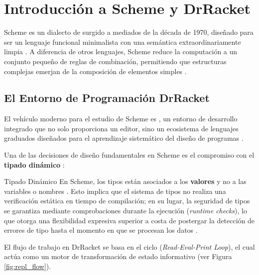 \section{Introducción a Scheme y DrRacket}
\label{sec:4_2_intro_scheme}

Scheme es un dialecto de  surgido a mediados de la década de 1970, diseñado para ser un lenguaje funcional minimalista con una semántica extraordinariamente limpia \cite{SICP}. A diferencia de otros lenguajes, Scheme reduce la computación a un conjunto pequeño de reglas de combinación, permitiendo que estructuras complejas emerjan de la composición de elementos simples \cite{SICP, HtDP}.

\subsection{El Entorno de Programación DrRacket}
\label{subsec:4_2_1_drracket}

El vehículo moderno para el estudio de Scheme es , un entorno de desarrollo integrado que no solo proporciona un editor, sino un ecosistema de lenguajes graduados diseñados para el aprendizaje sistemático del diseño de programas \cite{HtDP}.

Una de las decisiones de diseño fundamentales en Scheme es el compromiso con el \textbf{tipado dinámico} \cite{SICP}:

\begin{definicion}{Tipado Dinámico}
En Scheme, los tipos están asociados a los \textbf{valores} y no a las variables o nombres \cite{SICP}. Esto implica que el sistema de tipos no realiza una verificación estática en tiempo de compilación; en su lugar, la seguridad de tipos se garantiza mediante comprobaciones durante la ejecución (\textit{runtime checks}), lo que otorga una flexibilidad expresiva superior a costa de postergar la detección de errores de tipo hasta el momento en que se procesan los datos \cite{SICP, HtDP}.
\end{definicion}

El flujo de trabajo en DrRacket se basa en el ciclo  (\textit{Read-Eval-Print Loop}), el cual actúa como un motor de transformación de estado informativo (ver Figura \ref{fig:repl_flow}).

